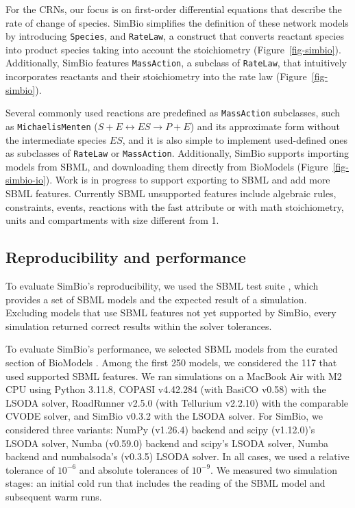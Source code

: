 \documentclass[namedate,numsec,webpdf,modern,large]{oup-authoring-template}
\theoremstyle{thmstyleone}%
\theoremstyle{thmstyletwo}%
\theoremstyle{thmstylethree}%
\begin{document}
For the \acp{CRN},
our focus is on first-order differential equations that describe the rate of change of species.
SimBio simplifies the definition of these network models by introducing \texttt{Species},
and \texttt{RateLaw}, a construct that converts reactant species into product species taking into account the stoichiometry (Figure~\ref{fig-simbio}).
Additionally, SimBio features \texttt{MassAction},
a subclass of \texttt{RateLaw},
that intuitively incorporates reactants and their stoichiometry into the rate law (Figure~\ref{fig-simbio}).

Several commonly used reactions are predefined as \texttt{MassAction} subclasses,
such as \texttt{MichaelisMenten} (\(S + E \leftrightarrow ES \rightarrow P + E\))
and its approximate form without the intermediate species \(ES\),
and it is also simple to implement used-defined ones
as subclasses of \texttt{RateLaw} or \texttt{MassAction}.
Additionally, SimBio supports importing models from \ac{SBML},
and downloading them directly from BioModels \citep{malik-sheriffBioModels15Years2020} (Figure~\ref{fig-simbio-io}).
Work is in progress to support exporting to \ac{SBML} and add more \ac{SBML} features.
Currently \ac{SBML} unsupported features include
algebraic rules, constraints, events, reactions with the fast attribute or with math stoichiometry,
units and compartments with size different from 1.

\subsection{Reproducibility and performance}
\label{reproducibility-and-performance}

To evaluate SimBio's reproducibility,
we used the \ac{SBML} test suite \citep{SBMLTestSuite},
which provides a set of \ac{SBML} models
and the expected result of a simulation.
Excluding models that use \ac{SBML} features not yet supported by SimBio,
every simulation returned correct results within the solver tolerances.

To evaluate SimBio's performance,
we selected \ac{SBML} models from the curated section of BioModels \citep{malik-sheriffBioModels15Years2020}.
Among the first 250 models,
we considered the 117 that used supported \ac{SBML} features.
We ran simulations
on a MacBook Air with M2 CPU
using Python 3.11.8,
COPASI v4.42.284
(with BasiCO v0.58) with the LSODA solver,
RoadRunner v2.5.0 (with Tellurium v2.2.10) with the comparable CVODE solver, and
SimBio v0.3.2 with the LSODA solver.
For SimBio, we considered three variants:
NumPy (v1.26.4) backend and scipy (v1.12.0)'s LSODA solver,
Numba (v0.59.0) backend and scipy's LSODA solver,
Numba backend and numbalsoda's (v0.3.5) LSODA solver.
In all cases, we used a relative tolerance of \(10^{-6}\) and absolute tolerances of \(10^{-9}\).
We measured two simulation stages:
an initial cold run that includes the reading of the \ac{SBML} model
and subsequent warm runs.
\end{document}
